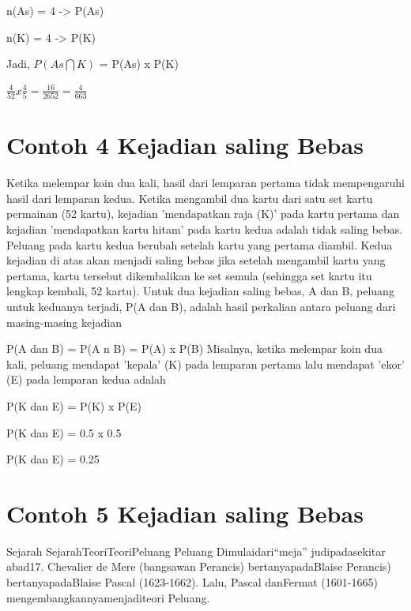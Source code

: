 \documentclass[11pt,fleqn]{book} %
\begin{document}
{\vspace{0.5in}

n(As) = 4 -> P(As)

\vspace{0.5in}

n(K) = 4 -> P(K) 

\vspace{0.5in}

Jadi, $ P(As\bigcap K) $ = P(As) x P(K) 

$ \frac{4}{52} x \frac{4}{5} = \frac{16}{2652} = \frac{4}{663} $

\section{Contoh 4 Kejadian saling Bebas}

Ketika melempar koin dua kali, hasil dari lemparan pertama tidak mempengaruhi hasil dari lemparan kedua.
Ketika mengambil dua kartu dari satu set kartu permainan (52 kartu), kejadian 'mendapatkan raja (K)' pada kartu pertama dan kejadian 'mendapatkan kartu hitam' pada kartu kedua adalah
tidak saling bebas. Peluang pada kartu kedua berubah setelah kartu yang pertama diambil. 
\vspace{0.3in} 
Kedua kejadian di atas akan menjadi saling bebas jika setelah mengambil kartu yang pertama, kartu tersebut dikembalikan ke set semula (sehingga set kartu itu lengkap kembali, 52 kartu).
\vspace{0.3in} 
Untuk dua kejadian saling bebas, A dan B, peluang untuk keduanya terjadi, P(A dan B), adalah hasil perkalian antara peluang dari masing-masing kejadian

\vspace{0.5in}
P(A dan B) = P(A n B) = P(A) x P(B)
Misalnya, ketika melempar koin dua kali, peluang mendapat 'kepala' (K) pada lemparan pertama lalu mendapat 'ekor' (E) pada lemparan kedua adalah

\vspace{0.5in}
P(K dan E) = P(K) x P(E)

\vspace{0.5in}
P(K dan E) = 0.5 x 0.5

\vspace{0.5in}
P(K dan E) = 0.25

\section{Contoh 5 Kejadian saling Bebas}


Sejarah SejarahTeoriTeoriPeluang Peluang
Dimulaidari“meja” judipadasekitar abad17.
Chevalier de Mere (bangsawan Perancis) bertanyapadaBlaise Perancis) bertanyapadaBlaise Pascal (1623-1662).
Lalu, Pascal danFermat (1601-1665) mengembangkannyamenjaditeori Peluang.

}
\end{document}
